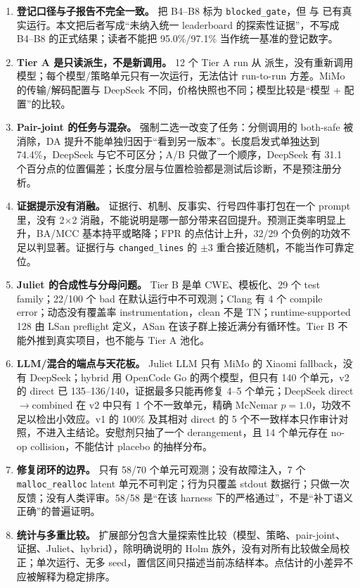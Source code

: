 \documentclass[conference]{IEEEtran}
\begin{document}
\begin{enumerate}
    \item \textbf{登记口径与子报告不完全一致。}  把 B4--B8 标为 \texttt{blocked\_gate}，但  与  已有真实运行。本文把后者写成“未纳入统一 leaderboard 的探索性证据”，不写成 B4--B8 的正式结果；读者不能把 95.0\%/97.1\% 当作统一基准的登记数字。
    \item \textbf{Tier A 是只读派生，不是新调用。} 12 个 Tier A run 从  派生，没有重新调用模型；每个模型/策略单元只有一次运行，无法估计 run-to-run 方差。MiMo 的传输/解码配置与 DeepSeek 不同，价格快照也不同；模型比较是“模型 + 配置”的比较。
    \item \textbf{Pair-joint 的任务与混杂。} 强制二选一改变了任务：分侧调用的 both-safe 被消除，DA 提升不能单独归因于“看到另一版本”。长度启发式单独达到 74.4\%，DeepSeek 与它不可区分；A/B 只做了一个顺序，DeepSeek 有 31.1 个百分点的位置偏差；长度分层与位置检验都是测试后诊断，不是预注册分析。
    \item \textbf{证据提示没有消融。} 证据行、机制、反事实、行号四件事打包在一个 prompt 里，没有 2$\times$2 消融，不能说明是哪一部分带来召回提升。预测正类率明显上升，BA/MCC 基本持平或略降；FPR 的点估计上升，32/29 个负例的功效不足以判显著。证据行与 \texttt{changed\_lines} 的 $\pm3$ 重合接近随机，不能当作可靠定位。
    \item \textbf{Juliet 的合成性与分母问题。} Tier B 是单 CWE、模板化、29 个 test family；22/100 个 bad 在默认运行中不可观测；Clang 有 4 个 compile error；动态没有覆盖率 instrumentation，clean 不是 TN；runtime-supported 128 由 LSan preflight 定义，ASan 在该子群上接近满分有循环性。Tier B 不能外推到真实项目，也不能与 Tier A 池化。
    \item \textbf{LLM/混合的端点与天花板。} Juliet LLM 只有 MiMo 的 Xiaomi fallback，没有 DeepSeek；hybrid 用 OpenCode Go 的两个模型，但只有 140 个单元，v2 的 direct 已 135--136/140，证据最多只能再修复 4--5 个单元；DeepSeek direct$\to$combined 在 v2 中只有 1 个不一致单元，精确 McNemar $p=1.0$，功效不足以检出小效应。v1 的 100\% 及其相对 direct 的 5 个不一致样本只作审计对照，不进入主结论。安慰剂只抽了一个 derangement，且 14 个单元存在 no-op collision，不能估计 placebo 的抽样分布。
    \item \textbf{修复闭环的边界。} 只有 58/70 个单元可观测；没有故障注入，7 个 \texttt{malloc\_realloc} latent 单元不可判定；行为只覆盖 stdout 数据行；只做一次反馈；没有人类评审。58/58 是“在该 harness 下的严格通过”，不是“补丁语义正确”的普遍证明。
    \item \textbf{统计与多重比较。} 扩展部分包含大量探索性比较（模型、策略、pair-joint、证据、Juliet、hybrid），除明确说明的 Holm 族外，没有对所有比较做全局校正；单次运行、无多 seed，置信区间只描述当前冻结样本。点估计的小差异不应被解释为稳定排序。

\end{enumerate}
\end{document}
